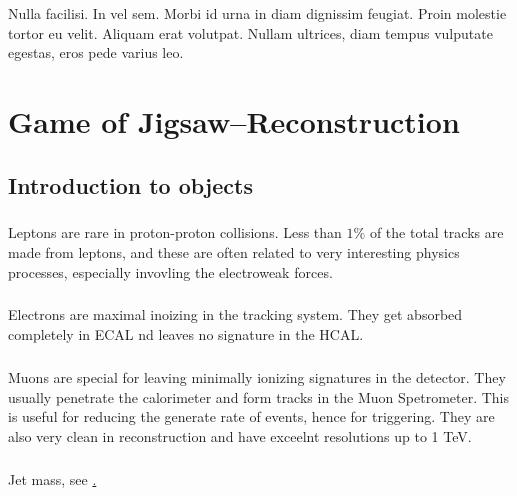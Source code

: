 \begin{savequote}[75mm]
Nulla facilisi. In vel sem. Morbi id urna in diam dignissim feugiat. Proin molestie tortor eu velit. Aliquam erat volutpat. Nullam ultrices, diam tempus vulputate egestas, eros pede varius leo.
\end{savequote}

\chapter{Game of Jigsaw--Reconstruction}

\section{Introduction to objects}

\paragraph{}
Leptons are rare in proton-proton collisions. Less than $1\%$ of the total tracks are made from leptons, and these are often related to very interesting physics processes, especially invovling the electroweak forces.

\paragraph{}
Electrons are maximal inoizing in the tracking system. They get absorbed completely in ECAL nd leaves no signature in the HCAL.

\paragraph{}
Muons are special for leaving minimally ionizing signatures in the detector. They usually penetrate the calorimeter and form tracks in the Muon Spetrometer. This is useful for reducing the generate rate of events, hence for triggering. They are also very clean in reconstruction and have exceelnt resolutions up to 1 TeV.

\paragraph{}
Jet mass, see \href{https://cds.cern.ch/record/2200211/files/ATLAS-CONF-2016-035.pdf}.